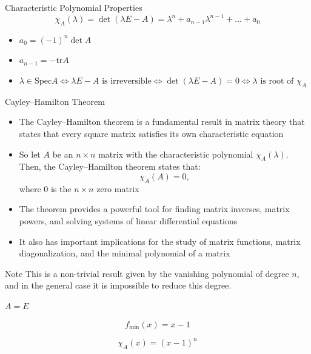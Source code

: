 \documentclass[fullscreen=true, bookmarks=true, hyperref={pdfencoding=unicode}]{beamer}
\begin{document}
\begin{frame}{Characteristic Polynomial Properties}
  \[
    \chi_A(\lambda) = \det(\lambda E - A) = 
    \lambda^n + a_{n-1}\lambda^{n-1} + \hdots + a_0
  \]
  \begin{itemize}
    \item $a_0 = (-1)^n \det A$
    \item $a_{n-1} = -\mathrm{tr} A$
    \item $\lambda \in \mathrm{Spec}A \iff \lambda E - A \text{ is irreversible}
    \iff \det(\lambda E - A) = 0 \iff \lambda \text{ is root of } \chi_A$
  \end{itemize}
\end{frame}


\begin{frame}{Cayley--Hamilton Theorem}
  \begin{itemize}
    \item The Cayley--Hamilton theorem is a fundamental result 
    in matrix theory that states that every square matrix satisfies 
    its own characteristic equation
    \pause
    \item So let $A$ be an $n \times n$ matrix 
    with the characteristic polynomial $\chi_A(\lambda)$. 
    Then, the Cayley--Hamilton theorem states that:
      \[
        \chi_A(A) = 0,
      \]
      where 0 is the $n \times n$ zero matrix
    \pause
    \item The theorem provides a powerful tool for finding 
    matrix inverses, matrix powers, and solving systems of 
    linear differential equations
    \item It also has important implications for the study 
    of matrix functions, matrix diagonalization, and 
    the minimal polynomial of a matrix
  \end{itemize}

  \pause
  \begin{block}{Note}
    \small This is a non-trivial result given by the vanishing polynomial 
    of degree $n$, and in the general case it is impossible 
    to reduce this degree.
  \end{block}
\end{frame}


\begin{frame}
  \begin{example}
    $A=E$

    $$f_{\min} (x) = x - 1$$

    $$ \chi_A(x) = (x-1)^n$$
  \end{example}
\end{frame}
\end{document}
